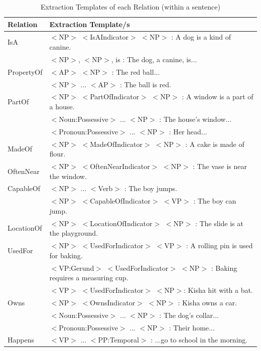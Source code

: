 \begin{table}[H]   %
\centering
\caption{Extraction Templates of each Relation (within a sentence)} \vspace{0.25em}
\begin{tabular}{|p{3.5cm}|p{10cm}|} \hline
\textbf{Relation} & \textbf{Extraction Template/s} \\ \hline
IsA					& $<$NP$>$ $<$IsAIndicator$>$ $<$NP$>$ : A dog is a kind of canine. \\
					& $<$NP$>$, $<$NP$>$, is : The dog, a canine, is... \\ \hline
PropertyOf			& $<$AP$>$ $<$NP$>$ : The red ball... \\
					& $<$NP$>$ ... $<$AP$>$ : The ball is red. \\ \hline
PartOf				& $<$NP$>$ $<$PartOfIndicator$>$ $<$NP$>$ : A window is a part of a house. \\
					& $<$Noun:Possessive$>$ ... $<$NP$>$ : The house's window... \\
					& $<$Pronoun:Possessive$>$ ... $<$NP$>$ : Her head... \\ \hline
MadeOf				& $<$NP$>$ $<$MadeOfIndicator$>$ $<$NP$>$ : A cake is made of flour. \\ \hline
OftenNear			& $<$NP$>$ $<$OftenNearIndicator$>$ $<$NP$>$ : The vase is near the window. \\ \hline
CapableOf			& $<$NP$>$ ... $<$Verb$>$ : The boy jumps. \\
					& $<$NP$>$ $<$CapableOfIndicator$>$ $<$VP$>$ : The boy can jump. \\ \hline
LocationOf			& $<$NP$>$ $<$LocationOfIndicator$>$ $<$NP$>$ : The slide is at the playground. \\ \hline
UsedFor				& $<$NP$>$ $<$UsedForIndicator$>$ $<$VP$>$ : A rolling pin is used for baking. \\
					& $<$VP:Gerund$>$ $<$UsedForIndicator$>$ $<$NP$>$ : Baking requires a measuring cup. \\
					& $<$VP$>$ $<$UsedForIndicator$>$ $<$NP$>$: Kisha hit with a bat. \\ \hline
Owns				& $<$NP$>$ $<$OwnsIndicator$>$ $<$NP$>$ : Kisha owns a car. \\
					& $<$Noun:Possessive$>$ ... $<$NP$>$ : The dog's collar... \\
					& $<$Pronoun:Possessive$>$ ... $<$NP$>$ : Their home... \\ \hline
Happens				& $<$VP$>$ ... $<$PP:Temporal$>$ : ...go to school in the morning. \\

\end{tabular}
\end{table}
